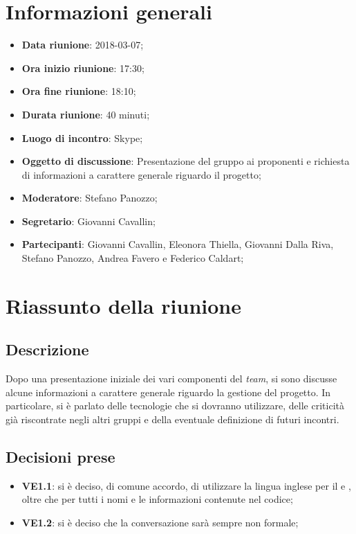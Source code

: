 \section{Informazioni generali}
	\begin{itemize}
		\item \textbf{Data riunione}: 2018-03-07;
		\item \textbf{Ora inizio riunione}: 17:30;
		\item \textbf{Ora fine riunione}: 18:10;
		\item \textbf{Durata riunione}: 40 minuti;
		\item \textbf{Luogo di incontro}: Skype;
		\item \textbf{Oggetto di discussione}: Presentazione del gruppo ai proponenti e richiesta di informazioni a carattere generale riguardo il progetto;
		\item \textbf{Moderatore}: Stefano Panozzo;
		\item \textbf{Segretario}: Giovanni Cavallin;
		\item \textbf{Partecipanti}: Giovanni Cavallin, Eleonora Thiella, Giovanni Dalla Riva, Stefano Panozzo, Andrea Favero e Federico Caldart;
	\end{itemize}

\section{Riassunto della riunione}
	\subsection{Descrizione}
	Dopo una presentazione iniziale dei vari componenti del \emph{team}, si sono discusse alcune informazioni a carattere generale riguardo la gestione del progetto. In particolare, si è parlato delle tecnologie che si dovranno utilizzare, delle criticità già riscontrate negli altri gruppi e della eventuale definizione di futuri incontri.
	\subsection{Decisioni prese}
		\begin{itemize}
			\item \textbf{VE1.1}: si è deciso, di comune accordo, di utilizzare la lingua inglese per il \MU{} e \MS{}, oltre che per tutti i nomi e le informazioni contenute nel codice;
			\item \textbf{VE1.2}: si è deciso che la conversazione sarà sempre non formale;
		\end{itemize}